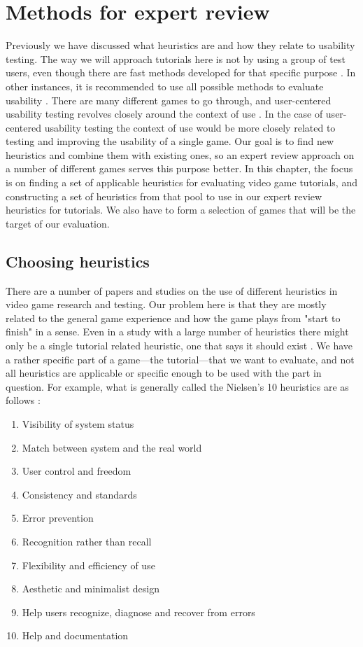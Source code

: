 \chapter{Methods for expert review}
Previously we have discussed what heuristics are and how they relate to usability testing. The way we will approach tutorials here is not by using a group of test users, even though there are fast methods developed for that specific purpose \cite{Kjeldskov2004}. In other instances, it is recommended to use all possible methods to evaluate usability \cite{Schaffer2007}. There are many different games to go through, and user-centered usability testing revolves closely around the context of use \cite{Tarkkanen2013}. In the case of user-centered usability testing the context of use would be more closely related to testing and improving the usability of a single game. Our goal is to find new heuristics and combine them with existing ones, so an expert review approach on a number of different games serves this purpose better. In this chapter, the focus is on finding a set of applicable heuristics for evaluating video game tutorials, and constructing a set of heuristics from that pool to use in our expert review heuristics for tutorials. We also have to form a selection of games that will be the target of our evaluation.

\section{Choosing  heuristics}
There are a number of papers and studies on the use of different heuristics in video game research and testing. Our problem here is that they are mostly related to the general game experience and how the game plays from "start to finish" in a sense. Even in a study with a large number of heuristics there might only be a single tutorial related heuristic, one that says it should exist \cite{Almeida2010a}. We have a rather specific part of a game---the tutorial---that we want to evaluate, and not all heuristics are applicable or specific enough to be used with the part in question. For example, what is generally called the Nielsen's 10 heuristics are as follows \cite{Nielsen1993}: 

\begin{enumerate}
	\item Visibility of system status
	\item Match between system and the real world
	\item User control and freedom
	\item Consistency and standards
	\item Error prevention
	\item Recognition rather than recall
	\item Flexibility and efficiency of use
	\item Aesthetic and minimalist design
	\item Help users recognize, diagnose and recover from errors
	\item Help and documentation
\end{enumerate}

